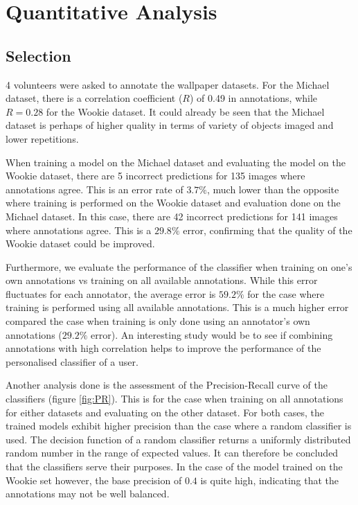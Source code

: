 %
\newpage
\chapter{Quantitative Analysis\label{sec:quantitative}}

\section{Selection}

4 volunteers were asked to annotate the wallpaper datasets.
For the Michael dataset, there is a correlation coefficient ($R$) of 0.49 in
annotations, while $R=0.28$ for the Wookie dataset.
It could already be seen that the Michael dataset is perhaps of higher quality
in terms of variety of objects imaged and lower repetitions.

When training a model on the Michael dataset and evaluating the model on the
Wookie dataset, there are 5 incorrect predictions for 135 images where
annotations agree.
This is an error rate of $3.7\%$, much lower than the opposite where training is
performed on the Wookie dataset and evaluation done on the Michael dataset.
In this case, there are 42 incorrect predictions for 141 images where
annotations agree.
This is a $29.8\%$ error, confirming that the quality of the Wookie dataset
could be improved.

Furthermore, we evaluate the performance of the classifier when training on
one's own annotations vs training on all available annotations.
While this error fluctuates for each annotator, the average error is $59.2\%$
for the case where training is performed using all available annotations.
This is a much higher error compared the case when training is only done using
an annotator’s own annotations ($29.2\%$ error).
An interesting study would be to see if combining annotations with high
correlation helps to improve the performance of the personalised classifier
of a user.

Another analysis done is the assessment of the Precision-Recall curve of the
classifiers (figure \ref{fig:PR}).
This is for the case when training on all annotations for either datasets and
evaluating on the other dataset.
For both cases, the trained models exhibit higher precision than the case where a random classifier is used.
The decision function of a random classifier returns a uniformly distributed random number in the range of expected values.
It can therefore be concluded that the classifiers serve their purposes.
In the case of the model trained on the Wookie set however, the base precision of $0.4$ is quite high, indicating that the annotations may not be well balanced.

